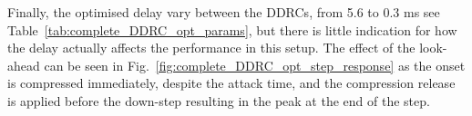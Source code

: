 \documentclass[../main2.tex]{subfiles}
\begin{document}
Finally, the optimised delay vary between the DDRCs, from 5.6 to 0.3 ms see Table~\ref{tab:complete_DDRC_opt_params}, but there is little indication for how the delay actually affects the performance in this setup. The effect of the look-ahead can be seen in Fig.~\ref{fig:complete_DDRC_opt_step_response} as the onset is compressed immediately, despite the attack time, and the compression release is applied before the down-step resulting in the peak at the end of the step.

\end{document}
